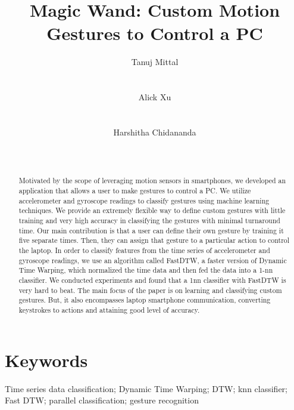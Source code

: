 \documentclass{sigchi}
\begin{document}
\title{Magic Wand: Custom Motion Gestures to Control a PC}


\author{
  \alignauthor Tanuj Mittal\\
    \\
    \\
  \alignauthor Alick Xu\\
    \\
    \\  
  \alignauthor Harshitha Chidananda\\
    \\
    \\ 
}

\maketitle

\begin{abstract}
Motivated by the scope of leveraging motion sensors in smartphones, we developed an application that allows a user to make gestures to control a PC. We utilize accelerometer and gyroscope readings to classify gestures using machine learning techniques. We provide an extremely flexible way to define custom gestures with little training and very high accuracy in classifying the gestures with minimal turnaround time. Our main contribution is that a user can define their own gesture by training it five separate times. Then, they can assign that gesture to a particular action to control the laptop. In order to classify features from the time series of accelerometer and gyroscope readings, we use an algorithm called FastDTW, a faster version of Dynamic Time Warping, which normalized the time data and then fed the data into a 1-nn classifier. We conducted experiments and found that a 1nn classifier with FastDTW is very hard to beat. The main focus of the paper is on learning and classifying custom gestures. But, it also encompasses laptop smartphone communication, converting keystrokes to actions and attaining good level of accuracy.
\end{abstract}

\section{Keywords}

Time series data classification; Dynamic Time Warping; DTW; knn classifier; Fast DTW; parallel classification; gesture recognition
\end{document}
